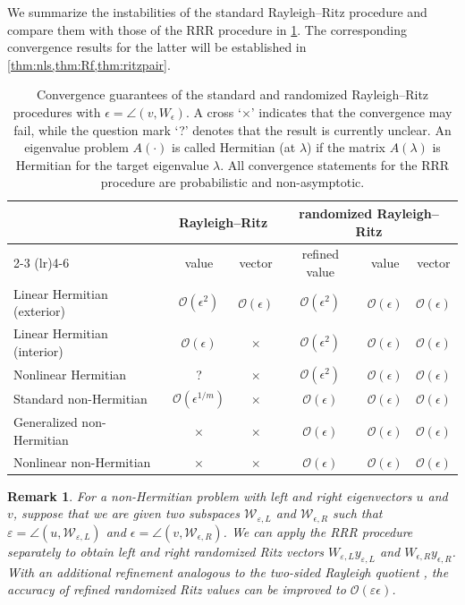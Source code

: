 \documentclass[a4paper,11pt]{article}
\newtheorem{remark}{Remark}
\newcommand{\order}{\mathcal{O}}
\begin{document}
We summarize the instabilities of the standard Rayleigh--Ritz procedure and compare them with those of the RRR procedure in \cref{tab:cmp}.
The corresponding convergence results for the latter will be established in \cref{thm:nls,thm:Rf,thm:ritzpair}.


\begin{table}[H]
    \centering
    \caption{Convergence guarantees of the standard and randomized Rayleigh--Ritz procedures with $\epsilon = \angle(v, W_{\epsilon})$. 
A cross `$\times$' indicates that the convergence may fail, while the question mark `?' denotes that the result is currently unclear. 
An eigenvalue problem $A(\cdot)$ is called Hermitian (at $\lambda$) if the matrix $A(\lambda)$ is Hermitian for the target eigenvalue $\lambda$. 
All convergence statements for the RRR procedure are probabilistic and non-asymptotic.}
    \begin{tabular}{lccccc}
        \toprule
        & \multicolumn{2}{c}{Rayleigh--Ritz}  & \multicolumn{3}{c}{randomized Rayleigh--Ritz} \\ \cmidrule(lr){2-3} \cmidrule(lr){4-6}
        & value & vector  & refined value & value & vector\\ \midrule
        Linear Hermitian (exterior) & $\order(\epsilon^{2})$ & $\order(\epsilon)$ & $\order(\epsilon^{2})$  & $\order(\epsilon)$ & $\order(\epsilon)$\\ 
        Linear Hermitian (interior) & $\order(\epsilon)$ & $\times$ & $\order(\epsilon^{2})$  & $\order(\epsilon)$ & $\order(\epsilon)$\\ 
        Nonlinear Hermitian& ? & $\times$ & $\order(\epsilon^{2})$  & $\order(\epsilon)$ & $\order(\epsilon)$\\ 
        Standard non-Hermitian & $\order(\epsilon^{1/m})$ & $\times$ & $\order(\epsilon)$  & $\order(\epsilon)$ & $\order(\epsilon)$\\ 
        Generalized non-Hermitian & $\times$ & $\times$ & $\order(\epsilon)$  & $\order(\epsilon)$ & $\order(\epsilon)$\\ 
        Nonlinear non-Hermitian & $\times$ & $\times$ & $\order(\epsilon)$  & $\order(\epsilon)$ & $\order(\epsilon)$\\
         \bottomrule
        \end{tabular}
    \label{tab:cmp}
\end{table}


\begin{remark}
For a non-Hermitian problem with left and right eigenvectors $u$ and $v$, suppose that we are given two subspaces $\mathcal{W}_{\varepsilon,L}$ and $\mathcal{W}_{\epsilon,R}$ such that $\varepsilon=\angle(u,\mathcal{W}_{\varepsilon,L})$ and $\epsilon=\angle(v,\mathcal{W}_{\epsilon,R})$.
We can apply the RRR procedure separately to obtain left and right randomized Ritz vectors $W_{\varepsilon,L}y_{\varepsilon,L}$ and $W_{\epsilon,R}y_{\epsilon,R}$.
With an additional refinement analogous to the two-sided Rayleigh quotient \cite{Schwetlick2012}, the accuracy of refined randomized Ritz values can be improved to $\order(\varepsilon\epsilon)$.
\end{remark}
\end{document}
